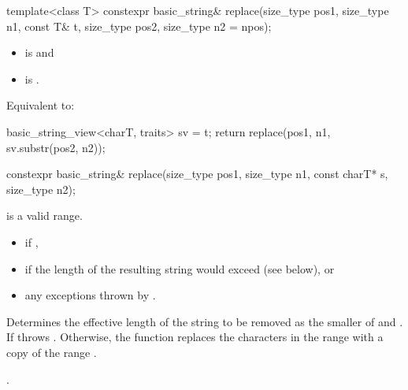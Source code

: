 %
\begin{itemdecl}
template<class T>
  constexpr basic_string& replace(size_type pos1, size_type n1, const T& t,
                                  size_type pos2, size_type n2 = npos);
\end{itemdecl}

\begin{itemdescr}
\pnum
\constraints
\begin{itemize}
\item
{} is
 and
\item
{} is
.
\end{itemize}

\pnum
\effects
Equivalent to:
\begin{codeblock}
basic_string_view<charT, traits> sv = t;
return replace(pos1, n1, sv.substr(pos2, n2));
\end{codeblock}
\end{itemdescr}

%
\begin{itemdecl}
constexpr basic_string& replace(size_type pos1, size_type n1, const charT* s, size_type n2);
\end{itemdecl}

\begin{itemdescr}
\pnum
\expects
{} is a valid range.

\pnum
\throws
\begin{itemize}
\item {} if ,
\item {} if the length of the resulting string
would exceed  (see below), or
\item any exceptions thrown by .
\end{itemize}

\pnum
\effects
Determines the effective length  of the string to be
removed as the smaller of  and . If
 throws . Otherwise,
the function replaces the characters in the range
with a copy of the range .

\pnum
\returns
{}.
\end{itemdescr}

